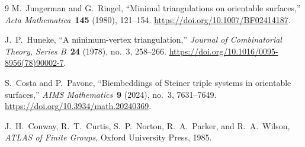 \begin{thebibliography}{9}
  M.~Jungerman and G.~Ringel,
  ``Minimal triangulations on orientable surfaces,''
  \textit{Acta Mathematica}\ \textbf{145} (1980), 121--154.
  \url{https://doi.org/10.1007/BF02414187}.

  J.~P.~Huneke,
  ``A minimum-vertex triangulation,''
  \textit{Journal of Combinatorial Theory, Series B}\ \textbf{24} (1978), no.~3, 258--266.
  \url{https://doi.org/10.1016/0095-8956(78)90002-7}.

  S.~Costa and P.~Pavone,
  ``Biembeddings of Steiner triple systems in orientable surfaces,''
  \textit{AIMS Mathematics}\ \textbf{9} (2024), no.~3, 7631--7649.
  \url{https://doi.org/10.3934/math.20240369}.

  J.~H.~Conway, R.~T.~Curtis, S.~P.~Norton, R.~A.~Parker, and R.~A.~Wilson,
  \textit{ATLAS of Finite Groups},
  Oxford University Press, 1985.
\end{thebibliography}
